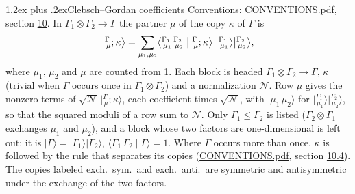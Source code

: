 \documentclass[10pt,a4paper]{article}
\makeatletter
\renewcommand\section{\@startsection{section}{1}{\z@}{-3ex plus -1ex minus -.2ex}%
  {1.2ex plus .2ex}{\normalfont\large\sffamily\bfseries\color{parttitle}}}
\numberwithin{equation}{section}
\newcommand{\irrprod}{\otimes}
\newcommand{\mult}{\kappa}
\newcommand{\intx}{\mu}
\newcommand{\cgnorm}{\mathcal{N}}
\newcommand{\cgket}[3]{\bigl\lvert{}^{#1}_{\,#2};#3\bigr\rangle}
\newcommand{\irket}[2]{\bigl\lvert{}^{#1}_{\,#2}\bigr\rangle}
\newcommand{\prodket}[2]{\lvert {#1}\,{#2}\rangle}
\newcommand{\ket}[1]{\lvert #1\rangle}
\newcommand{\cgck}[7]{\bigl\langle{}^{#1}_{\,#2}\,{}^{#3}_{\,#4}\bigm\vert{}^{#5}_{\,#6};#7\bigr\rangle}
\newcommand{\cgcone}[3]{\langle #1\,#2\mid #3\rangle}
\makeatother
\begin{document}
\section{Clebsch--Gordan coefficients}\label{s:clebsch_gordan}
Conventions: \href{../../CONVENTIONS.pdf}{CONVENTIONS.pdf}, section \href{../../CONVENTIONS.pdf\#conv.10}{10}.
\leavevmode\label{n:index.copy}\label{n:index.cg}\label{n:vector.ket.coupled}\label{n:function.cg.copy}In $\Gamma_1\irrprod\Gamma_2\to\Gamma$ the partner $\intx$ of the copy $\mult$ of $\Gamma$ is
\begin{equation}\label{e:cg}\cgket{\Gamma}{\intx}{\mult} = \sum_{\intx_1,\intx_2}\cgck{\Gamma_1}{\intx_1}{\Gamma_2}{\intx_2}{\Gamma}{\intx}{\mult}\;\irket{\Gamma_1}{\intx_1}\irket{\Gamma_2}{\intx_2},\end{equation}
where $\intx_1$, $\intx_2$ and $\intx$ are counted from 1. \label{n:index.normalisation}Each block is headed $\Gamma_1\irrprod\Gamma_2\to\Gamma$, $\mult$ (trivial when $\Gamma$ occurs once in $\Gamma_1\irrprod\Gamma_2$) and a normalization $\cgnorm$. \label{n:vector.ket.product}Row $\intx$ gives the nonzero terms of $\sqrt{\cgnorm}\,\cgket{\Gamma}{\intx}{\mult}$, each coefficient times $\sqrt{\cgnorm}$, with $\prodket{\intx_1}{\intx_2}$ for $\irket{\Gamma_1}{\intx_1}\irket{\Gamma_2}{\intx_2}$, so that the squared moduli of a row sum to $\cgnorm$. \label{n:vector.ket.one}\label{n:function.cg.one}Only $\Gamma_1 \le \Gamma_2$ is listed ($\Gamma_2\irrprod\Gamma_1$ exchanges $\intx_1$ and $\intx_2$), and a block whose two factors are one-dimensional is left out: it is $\ket{\Gamma} = \ket{\Gamma_1}\ket{\Gamma_2}$, $\cgcone{\Gamma_1}{\Gamma_2}{\Gamma} = 1$.
Where $\Gamma$ occurs more than once, $\mult$ is followed by the rule that separates its copies (\href{../../CONVENTIONS.pdf}{CONVENTIONS.pdf}, section \href{../../CONVENTIONS.pdf\#conv.10.4}{10.4}). \label{n:abbreviation.exchange}The copies labeled exch.\ sym.\ and exch.\ anti.\ are symmetric and antisymmetric under the exchange of the two factors.
\end{document}
